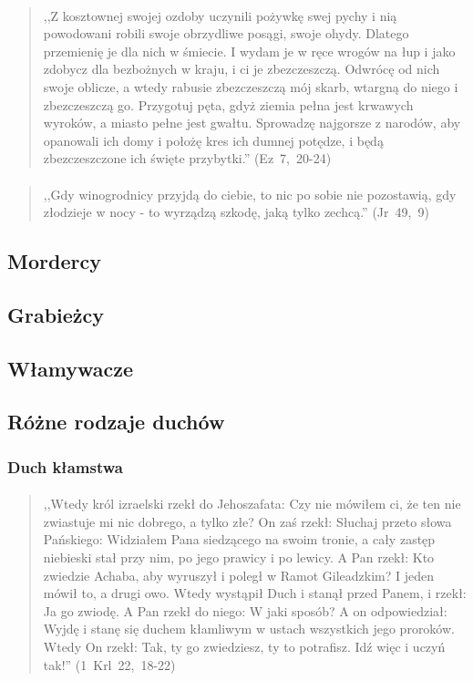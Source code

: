 \documentclass[10pt,a4paper,oneside]{article}
\begin{document}
\paragraph{}
\begin{quote}
,,Z kosztownej swojej ozdoby uczynili pożywkę swej pychy i nią powodowani robili swoje obrzydliwe posągi, swoje ohydy. Dlatego przemienię je dla nich w śmiecie. I wydam je w ręce wrogów na łup i jako zdobycz dla bezbożnych w kraju, i ci je zbezczeszczą. Odwrócę od nich swoje oblicze, a wtedy rabusie zbezczeszczą mój skarb, wtargną do niego i zbezczeszczą go. Przygotuj pęta, gdyż ziemia pełna jest krwawych wyroków, a miasto pełne jest gwałtu. Sprowadzę najgorsze z narodów, aby opanowali ich domy i położę kres ich dumnej potędze, i będą zbezczeszczone ich święte przybytki.'' \mbox{(Ez 7, 20-24)}
\end{quote}
\paragraph{}
\begin{quote}
,,Gdy winogrodnicy przyjdą do ciebie, to nic po sobie nie pozostawią, gdy złodzieje w nocy - to wyrządzą szkodę, jaką tylko zechcą.'' \mbox{(Jr 49, 9)}
\end{quote}
\subsection{Mordercy}
\subsection{Grabieżcy}
\subsection{Włamywacze}
\subsection{Różne rodzaje duchów}
\subsubsection{Duch kłamstwa}
\paragraph{}
\begin{quote}
,,Wtedy król izraelski rzekł do Jehoszafata: Czy nie mówiłem ci, że ten nie zwiastuje mi nic dobrego, a tylko złe? On zaś rzekł: Słuchaj przeto słowa Pańskiego: Widziałem Pana siedzącego na swoim tronie, a cały zastęp niebieski stał przy nim, po jego prawicy i po lewicy. A Pan rzekł: Kto zwiedzie Achaba, aby wyruszył i poległ w Ramot Gileadzkim? I jeden mówił to, a drugi owo. Wtedy wystąpił Duch i stanął przed Panem, i rzekł: Ja go zwiodę. A Pan rzekł do niego: W jaki sposób? A on odpowiedział: Wyjdę i stanę się duchem kłamliwym w ustach wszystkich jego proroków. Wtedy On rzekł: Tak, ty go zwiedziesz, ty to potrafisz. Idź więc i uczyń tak!'' \mbox{(1 Krl 22, 18-22)}
\end{quote}
\end{document}
